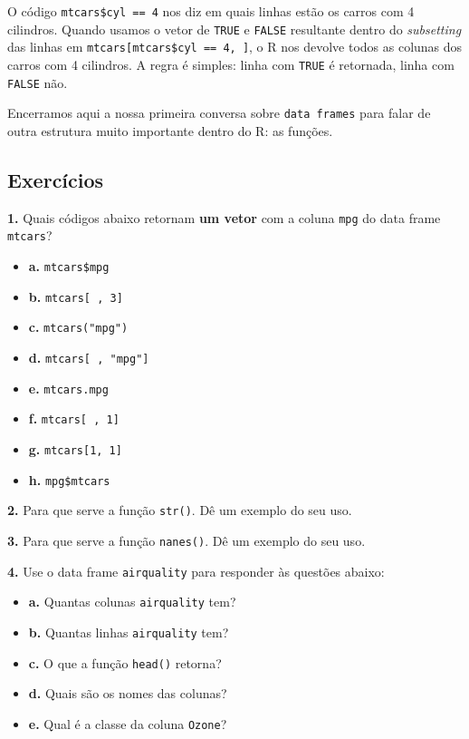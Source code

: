 \documentclass[
]{book}
\begin{document}
O código \texttt{mtcars\$cyl\ ==\ 4} nos diz em quais linhas estão os carros com 4 cilindros. Quando usamos o vetor de \texttt{TRUE} e \texttt{FALSE} resultante dentro do \emph{subsetting} das linhas em \texttt{mtcars{[}mtcars\$cyl\ ==\ 4,\ {]}}, o R nos devolve todos as colunas dos carros com 4 cilindros. A regra é simples: linha com \texttt{TRUE} é retornada, linha com \texttt{FALSE} não.

Encerramos aqui a nossa primeira conversa sobre \texttt{data\ frames} para falar de outra estrutura muito importante dentro do R: as funções.

\hypertarget{exercuxedcios-6}{%
\subsection*{Exercícios}\label{exercuxedcios-6}}

\textbf{1.} Quais códigos abaixo retornam \textbf{um vetor} com a coluna \texttt{mpg} do data frame \texttt{mtcars}?

\begin{itemize}
\item
  \textbf{a.} \texttt{mtcars\$mpg}
\item
  \textbf{b.} \texttt{mtcars{[}\ ,\ 3{]}}
\item
  \textbf{c.} \texttt{mtcars("mpg")}
\item
  \textbf{d.} \texttt{mtcars{[}\ ,\ "mpg"{]}}
\item
  \textbf{e.} \texttt{mtcars.mpg}
\item
  \textbf{f.} \texttt{mtcars{[}\ ,\ 1{]}}
\item
  \textbf{g.} \texttt{mtcars{[}1,\ 1{]}}
\item
  \textbf{h.} \texttt{mpg\$mtcars}
\end{itemize}

\textbf{2.} Para que serve a função \texttt{str()}. Dê um exemplo do seu uso.

\textbf{3.} Para que serve a função \texttt{nanes()}. Dê um exemplo do seu uso.

\textbf{4.} Use o data frame \texttt{airquality} para responder às questões abaixo:

\begin{itemize}
\item
  \textbf{a.} Quantas colunas \texttt{airquality} tem?
\item
  \textbf{b.} Quantas linhas \texttt{airquality} tem?
\item
  \textbf{c.} O que a função \texttt{head()} retorna?
\item
  \textbf{d.} Quais são os nomes das colunas?
\item
  \textbf{e.} Qual é a classe da coluna \texttt{Ozone}?
\end{itemize}
\end{document}
